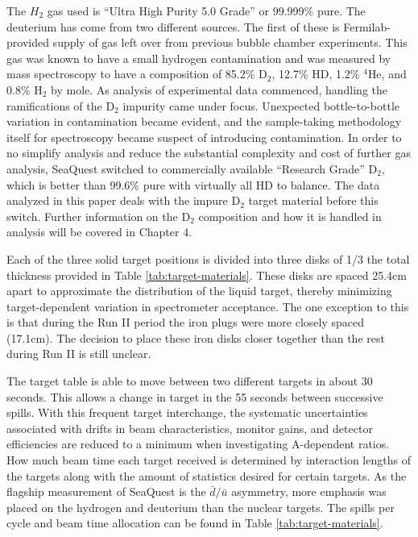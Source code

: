 The $H_2$ gas used is ``Ultra High Purity 5.0 Grade'' or 99.999\% pure.  The deuterium has come from two different
sources.  The first of these is Fermilab-provided supply of gas left over from previous bubble chamber experiments.
This gas was known to have a small hydrogen contamination and was measured by mass spectroscopy to have a composition
of 85.2\% D$_2$, 12.7\% HD, 1.2\% $^4$He, and 0.8\% H$_2$ by mole. As analysis of experimental data commenced, 
handling the ramifications of the D$_2$ impurity came under focus. Unexpected bottle-to-bottle variation in contamination
became evident, and the sample-taking methodology itself for spectroscopy became suspect of introducing contamination.
In order to no simplify analysis and reduce the substantial complexity and cost of further gas analysis, SeaQuest switched
to commercially available ``Research Grade'' D$_2$, which is better than 99.6\% pure with virtually all HD to balance.
The data analyzed in this paper deals with the impure D$_2$ target material before this switch. Further information on
the D$_2$ composition and how it is handled in analysis will be covered in Chapter 4.


Each of the three solid target positions is divided into three disks of 1/3 the total thickness provided in Table \ref{tab:target-materials}. These disks are spaced 25.4cm apart to approximate the distribution of the liquid target, thereby minimizing target-dependent variation in spectrometer acceptance. The one exception to this is that during the Run II period the iron plugs were more closely spaced (17.1cm). The decision to place these
iron disks closer together than the rest during Run II is still unclear.

The target table is able to move between two different targets in about 30 seconds. This allows a change in target in the 55 seconds between successive spills. With this frequent target interchange, the systematic uncertainties associated with drifts in beam characteristics, monitor gains, and detector efficiencies are reduced to a minimum when investigating A-dependent ratios. How much beam time each target received is determined by interaction lengths of the targets along with the amount of statistics desired for certain targets. As the flagship measurement of SeaQuest is the $\bar{d}/\bar{u}$ asymmetry, more emphasis was placed on the hydrogen and deuterium than the nuclear targets. The spills per cycle and beam time allocation can be found in Table \ref{tab:target-materials}.

